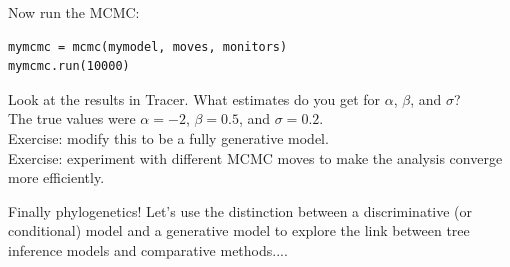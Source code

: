 \documentclass[mathserif]{beamer}
\begin{document}
\begin{frame}[fragile]
Now run the MCMC:
    \bigskip
    \begin{lstlisting}
mymcmc = mcmc(mymodel, moves, monitors)
mymcmc.run(10000)
    \end{lstlisting}
\bigskip
Look at the results in Tracer. What estimates do you get for $\alpha$, $\beta$, and $\sigma$?\\
    \bigskip
The true values were $\alpha = -2$, $\beta = 0.5$, and $\sigma = 0.2$.\\
    \bigskip
    \bigskip
    \alert{Exercise:} modify this to be a fully \alert{generative} model.\\
    \bigskip
    \alert{Exercise:} experiment with different MCMC moves to make the analysis converge more efficiently.
\end{frame}


\begin{frame}
    \begin{block}{Finally phylogenetics!}
        \bigskip
        Let's use the distinction between a \alert{discriminative} (or conditional) model and
        a \alert{generative} model to explore the link between tree inference models
        and comparative methods....
    \end{block}
\end{frame}




\end{document}

